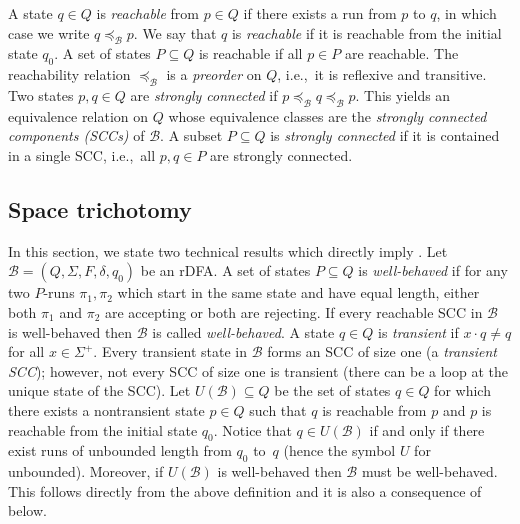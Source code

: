 \documentclass{article}\usepackage[a4paper,margin=20mm]{geometry}
\newcommand{\B}{\mathcal{B}}
\begin{document}
A state $q \in Q$ is {\em reachable} from $p \in Q$ if there exists a run from $p$ to $q$, in which case we write $q \preceq_\B p$.
We say that $q$ is {\em reachable} if it is reachable from the initial state $q_0$.
A set of states $P \subseteq Q$ is reachable if all $p \in P$ are reachable.
The reachability relation $\preceq_\B$ is a {\em preorder} on $Q$,
i.e.,~it is reflexive and transitive.
Two states $p,q \in Q$ are {\em strongly connected} if $p \preceq_\B q \preceq_\B p$.
This yields an equivalence relation on $Q$ whose equivalence classes 
 are the {\em strongly connected components (SCCs)} of $\B$.
A subset $P \subseteq Q$ is {\em strongly connected} if it is contained in a single SCC,
i.e.,~all  $p,q \in P$ are strongly connected.

\subsection{Space trichotomy}

In this section, we state two technical results which directly imply .
Let $\B = (Q,\Sigma,F,\delta,q_0)$ be an rDFA.
A set of states $P \subseteq Q$ is {\em well-behaved} if
for any two $P$-runs $\pi_1, \pi_2$ which start in the same state
and have equal length, either both $\pi_1$ and $\pi_2$ are accepting or both are rejecting.
If every reachable SCC in $\B$ is well-behaved then $\B$ is called {\em well-behaved}.
A state $q \in Q$ is {\em transient} if $x \cdot q \neq q$ for all $x \in \Sigma^+$.
Every transient state in $\B$ forms an SCC of size one (a {\em transient SCC});
however, not every SCC of size one is transient (there can be a loop at the unique state of the SCC).
Let $U(\B) \subseteq Q$ be the set of states $q \in Q$ for which there exists a nontransient state $p \in Q$
such that $q$ is reachable from $p$ and $p$ is reachable from the initial state $q_0$.
Notice that $q \in U(\B)$ if and only if there exist runs of unbounded length from $q_0$ to~$q$
(hence the symbol $U$ for unbounded). Moreover, if $U(\B)$ is well-behaved then $\B$ must be well-behaved.
This follows directly from the above definition and it is also a consequence of  below.
\end{document}

